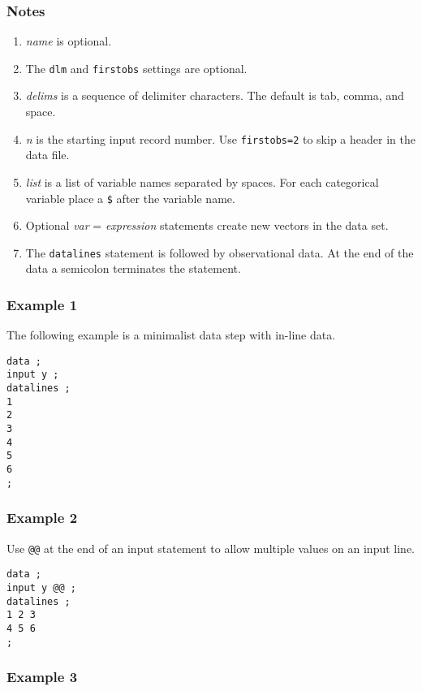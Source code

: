 \documentclass[12pt]{article}
\begin{document}
\subsubsection*{Notes}

\begin{enumerate}
\item
{\it name} is optional.
\item
The {\tt dlm} and {\tt firstobs} settings are optional.
\item
{\it delims} is a sequence of delimiter characters.
The default is tab, comma, and space.
\item
{\it n} is the starting input record number.
Use {\tt firstobs=2} to skip a header in the data file.
\item
{\it list} is a list of variable names separated by spaces.
For each categorical variable place a {\tt\$} after the variable name.
\item
Optional {\it var} = {\it expression} statements
create new vectors in the data set.
\item
The {\tt datalines} statement is followed by observational data.
At the end of the data a semicolon terminates the statement.
\end{enumerate}

\subsubsection*{Example 1}

The following example is a minimalist data step with in-line data.

{\footnotesize\begin{verbatim}
data ;
input y ;
datalines ;
1
2
3
4
5
6
;
\end{verbatim}}

\subsubsection*{Example 2}

Use \verb$@@$ at the end of an input statement to allow multiple
values on an input line.

{\footnotesize\begin{verbatim}
data ;
input y @@ ;
datalines ;
1 2 3
4 5 6
;
\end{verbatim}}

\subsubsection*{Example 3}
\end{document}
